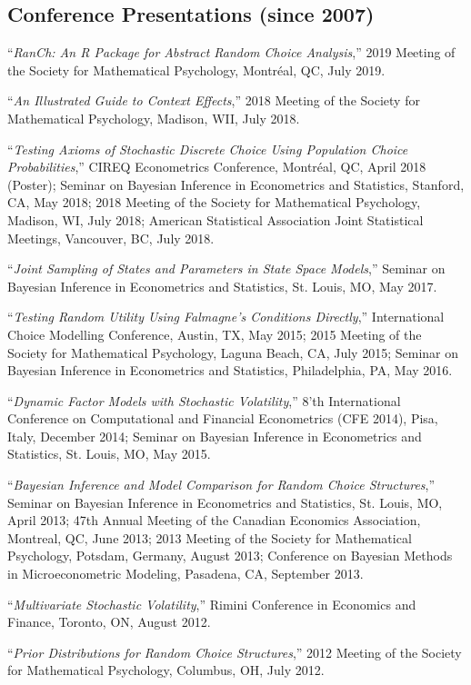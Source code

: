 \documentclass[12pt]{article}
\begin{document}
\subsection*{Conference Presentations (since 2007)}

``{\it RanCh: An R Package for Abstract Random Choice Analysis},''
2019 Meeting of the Society for Mathematical Psychology,
Montr\'eal, QC,
July 2019.

``{\it An Illustrated Guide to Context Effects},''
2018 Meeting of the Society for Mathematical Psychology,
Madison, WII,
July 2018.

``{\it Testing Axioms of Stochastic Discrete Choice Using Population Choice Probabilities},''
CIREQ Econometrics Conference,
Montr\'eal, QC,
April 2018 (Poster);
Seminar on Bayesian Inference in Econometrics and Statistics,
Stanford, CA,
May 2018;
2018 Meeting of the Society for Mathematical Psychology,
Madison, WI,
July 2018;
American Statistical Association Joint Statistical Meetings,
Vancouver, BC,
July 2018.

``{\it Joint Sampling of States and Parameters in State Space Models},''
Seminar on Bayesian Inference in Econometrics and Statistics,
St. Louis, MO,
May 2017.

``{\it Testing Random Utility Using Falmagne's Conditions Directly},''
International Choice Modelling Conference,
Austin, TX,
May 2015;
2015 Meeting of the Society for Mathematical Psychology,
Laguna Beach, CA,
July 2015;
Seminar on Bayesian Inference in Econometrics and Statistics,
Philadelphia, PA,
May 2016.

``{\it Dynamic Factor Models with Stochastic Volatility},''
8'th International Conference on Computational and Financial Econometrics (CFE 2014),
Pisa, Italy,
December 2014;
Seminar on Bayesian Inference in Econometrics and Statistics,
St. Louis, MO,
May 2015.

``{\it Bayesian Inference and Model Comparison for Random Choice Structures},''
Seminar on Bayesian Inference in Econometrics and Statistics,
St. Louis, MO,
April 2013;
47th Annual Meeting of the Canadian Economics Association,
Montreal, QC,
June 2013;
2013 Meeting of the Society for Mathematical Psychology,
Potsdam, Germany,
August 2013;
Conference on Bayesian Methods in Microeconometric Modeling,
Pasadena, CA,
September 2013.

``{\it Multivariate Stochastic Volatility},''
Rimini Conference in Economics and Finance,
Toronto, ON,
August 2012.

``{\it Prior Distributions for Random Choice Structures},''
2012 Meeting of the Society for Mathematical Psychology,
Columbus, OH,
July 2012.
\end{document}
